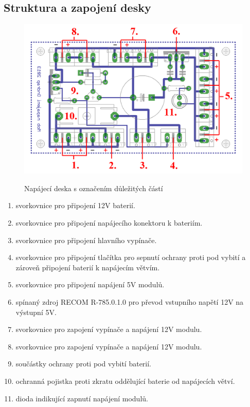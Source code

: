 \documentclass[a4paper,11pt]{article}
\begin{document}
\newpage
\subsection{Struktura a zapojení desky}

\begin{figure}[htbp]
	\centering
		\includegraphics{napajeniMobDeskaOznacena.png}
	\label{fig:napajeniMobDeskaOznacena}
	\caption{Napájecí deska s označením důležitých částí}
\end{figure}

\begin{enumerate}
	\item svorkovnice pro připojení 12V baterií. 
	\item svorkovnice pro připojení napájecího konektoru k bateriím.
	\item svorkovnice pro připojení hlavního vypínače.
	\item svorkovnice pro připojení tlačítka pro sepnutí ochrany proti pod vybití a zároveň připojení baterií k napájecím větvím.
	\item svorkovnice pro připojení napájení 5V modulů.
	\item spínaný zdroj RECOM R-785.0.1.0 pro převod vstupního napětí 12V na výstupní 5V.
	\item svorkovnice pro zapojení vypínače a napájení 12V modulu.
	\item svorkovnice pro zapojení vypínače a napájení 12V modulu.
	\item součástky ochrany proti pod vybití baterií.
	\item ochranná pojistka proti zkratu oddělující baterie od napájecích větví.
	\item dioda indikující zapnutí napájení modulů.
\end{enumerate}
\end{document}
